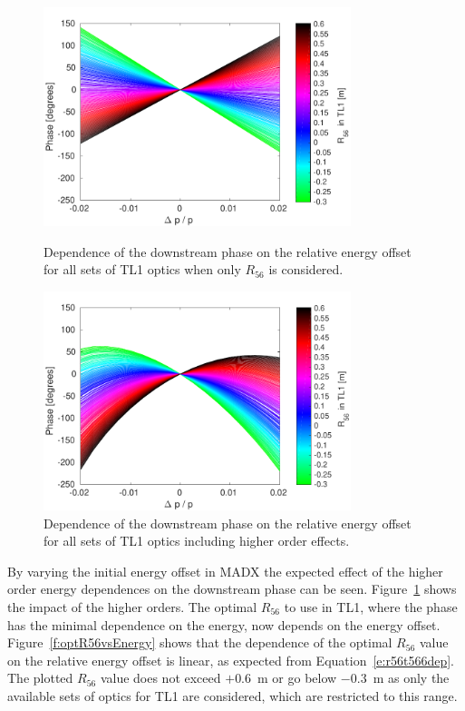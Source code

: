 \begin{figure}
  \centering
  \includegraphics[width=0.8\textwidth]{Figures/propagation/phaseVsEn_r56Only}
  \caption{Dependence of the downstream phase on the relative energy offset for all sets of TL1 optics when only \(R_{56}\) is considered.}
  \label{f:phaseVsEn_r56Only}  
  \centering
  \includegraphics[width=0.8\textwidth]{Figures/propagation/phaseVsEn_t566}
  \caption{Dependence of the downstream phase on the relative energy offset for all sets of TL1 optics including higher order effects.}
  \label{f:phaseVsEn_t566}
\end{figure}

By varying the initial energy offset in MADX the expected effect of the higher order energy dependences on the downstream phase can be seen. Figure~\ref{f:phaseVsEn_t566} shows the impact of the higher orders. The optimal \(R_{56}\) to use in TL1, where the phase has the minimal dependence on the energy, now depends on the energy offset. Figure~\ref{f:optR56vsEnergy} shows that the dependence of the optimal \(R_{56}\) value on the relative energy offset is linear, as expected from Equation~\ref{e:r56t566dep}. The plotted \(R_{56}\) value does not exceed \(+0.6\)~m or go below \(-0.3\)~m as only the available sets of optics for TL1 are considered, which are restricted to this range. %

